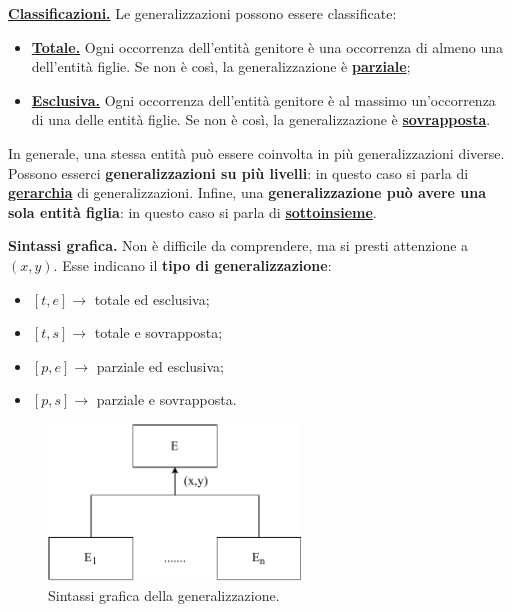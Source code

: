 \documentclass[a4paper]{article}
\begin{document}
	\noindent
	\textbf{\underline{Classificazioni.}} Le generalizzazioni possono essere classificate:
	
	\begin{itemize}
		\item \textbf{\underline{Totale.}} Ogni occorrenza dell'entità genitore è una occorrenza di almeno una dell'entità figlie. Se non è così, la generalizzazione è \textbf{\underline{parziale}};
		
		\item \textbf{\underline{Esclusiva.}} Ogni occorrenza dell'entità genitore è al massimo un'occorrenza di una delle entità figlie. Se non è così, la generalizzazione è \textbf{\underline{sovrapposta}}.
	\end{itemize}

	\noindent
	In generale, una stessa entità può essere coinvolta in più generalizzazioni diverse. Possono esserci \textbf{generalizzazioni su più livelli}: in questo caso si parla di \textbf{\underline{gerarchia}} di generalizzazioni. Infine, una \textbf{generalizzazione può avere una sola entità figlia}: in questo caso si parla di \textbf{\underline{sottoinsieme}}.
	
	\newpage
	
	\noindent
	\textcolor{Green4}{\textbf{Sintassi grafica.}} Non è difficile da comprendere, ma si presti attenzione a $\left(x, y\right)$. Esse indicano il \textbf{tipo di generalizzazione}:
	
	\begin{itemize}
		\item $\left[t,e\right] \rightarrow$ totale ed esclusiva;
		
		\item $\left[t,s\right] \rightarrow$ totale e sovrapposta;
		
		\item $\left[p,e\right] \rightarrow$ parziale ed esclusiva;
		
		\item $\left[p,s\right] \rightarrow$ parziale e sovrapposta.
	\end{itemize}

	\begin{figure}[!htp]
		\centering
		\includegraphics[width=0.6\textwidth]{img/generalizzazione_sintassi.pdf}
		\caption{Sintassi grafica della generalizzazione.}
	\end{figure}
\end{document}
